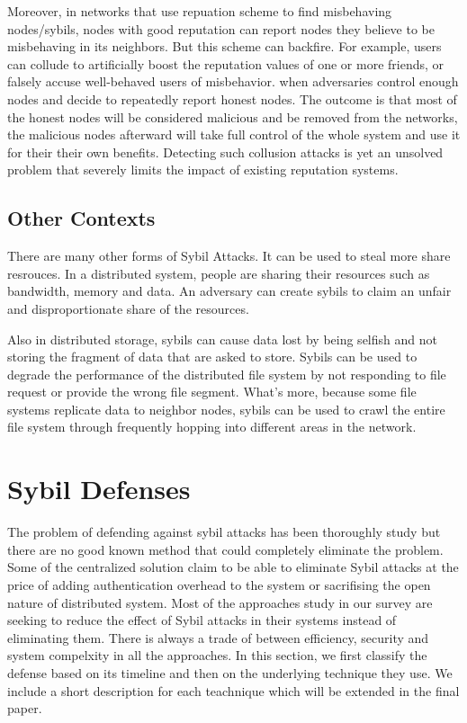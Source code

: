 \documentclass[conference]{IEEEtran}
\begin{document}
Moreover, in networks that use repuation scheme to find misbehaving nodes/sybils, nodes with good reputation can report nodes they believe to be misbehaving in its neighbors. But this scheme can backfire.  For example, users can collude to artificially boost the reputation values of one or more friends, or falsely accuse well-behaved users of misbehavior. when adversaries control enough nodes and decide to repeatedly report honest nodes. The outcome is that most of the honest nodes will be considered malicious and be removed from the networks, the malicious nodes afterward will take full control of the whole system and use it for their their own benefits. Detecting such collusion attacks is yet an unsolved problem that severely limits the impact of existing reputation systems.\cite{Swamynathan10reputation}\cite{Lian07anempirical}


\subsection{Other Contexts}
There are many other forms of Sybil Attacks. It can be used to steal more share resrouces.
In a distributed system, people are sharing their resources such as bandwidth, memory and data. An adversary can create sybils to claim an unfair and disproportionate share of the resources. 

Also in distributed storage, sybils can cause data lost by being selfish and not storing the fragment of data that are asked to store. Sybils can be used to degrade the performance of the distributed file system by not responding to file request or provide the wrong file segment. What's more, because some file systems replicate data to neighbor nodes, sybils can be used to crawl the entire file system through frequently hopping into different areas in the network.\cite{Lian07anempirical}\cite{wolchok09defeatingvanish}


\section{Sybil Defenses}
The problem of defending against sybil attacks has been thoroughly study but there are no good known method that could completely eliminate the problem. Some of the centralized solution claim to be able to eliminate Sybil attacks at the price of adding authentication overhead to the system or sacrifising the open nature of distributed system. Most of the approaches study in our survey are seeking to reduce the effect of Sybil attacks in their systems instead of eliminating them. There is always a trade of between efficiency, security and system compelxity in all the approaches. In this section, we first classify the defense based on its timeline and then on the underlying technique they use. We include a short description for each teachnique which will be extended in the final paper.
\end{document}
